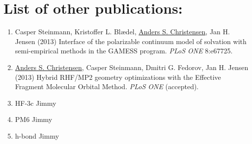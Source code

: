 \section*{List of other publications:}
\begin{enumerate}
    \item Casper Steinmann, Kristoffer L. Blædel, \underline{Anders S. Christensen}, Jan H. Jensen (2013) Interface of the polarizable continuum model of solvation with semi-empirical methods in the GAMESS program. \textit{PLoS ONE} 8:e67725.
    \item \underline{Anders S. Christensen}, Casper Steinmann, Dmitri G. Fedorov, Jan H. Jensen (2013) Hybrid RHF/MP2 geometry optimizations with the Effective Fragment Molecular Orbital Method. \textit{PLoS ONE} (accepted).
    \item HF-3c Jimmy
    \item PM6 Jimmy
    \item h-bond Jimmy
\end{enumerate}

